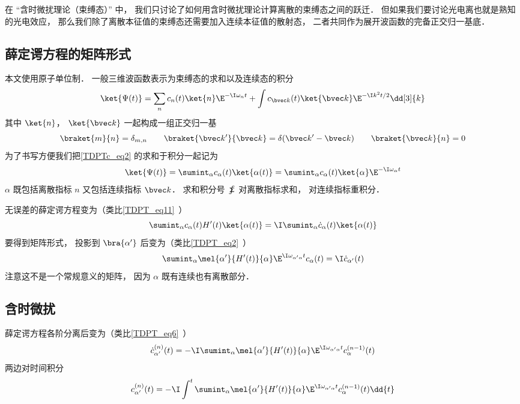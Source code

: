 

在 “含时微扰理论（束缚态）” 中， 我们只讨论了如何用含时微扰理论计算离散的束缚态之间的跃迁． 但如果我们要讨论光电离也就是熟知的光电效应， 那么我们除了离散本征值的束缚态还需要加入连续本征值的散射态， 二者共同作为展开波函数的完备正交归一基底．

\subsection{薛定谔方程的矩阵形式}
本文使用原子单位制． 一般三维波函数表示为束缚态的求和以及连续态的积分
\begin{equation}\label{TDPTc_eq2}
\ket{\Psi(t)} = \sum_n c_n(t)\ket{n}\E^{-\I\omega_n t} + \int c_{\bvec k}(t)\ket{\bvec k}\E^{-\I k^2 t/2} \dd[3]{k}
\end{equation}
其中 $\ket{n}$， $\ket{\bvec k}$ 一起构成一组正交归一基
\begin{equation}
\braket{m}{n} = \delta_{m,n} \qquad
\braket{\bvec k'}{\bvec k} = \delta(\bvec k' - \bvec k) \qquad
\braket{\bvec k}{n} = 0
\end{equation}
为了书写方便我们把\autoref{TDPTc_eq2} 的求和于积分一起记为
\begin{equation}
\ket{\Psi(t)} = \sumint_\alpha c_\alpha(t) \ket{\alpha(t)} = \sumint_\alpha c_\alpha(t) \ket{\alpha}\E^{-\I\omega_\alpha t} 
\end{equation}
$\alpha$ 既包括离散指标 $n$ 又包括连续指标 $\bvec k$． 求和积分号 $\sumint$ 对离散指标求和， 对连续指标重积分．

无误差的薛定谔方程变为（类比\autoref{TDPT_eq11}~）
\begin{equation}
\sumint_\alpha c_\alpha(t) H'(t) \ket{\alpha(t)} = \I \sumint_\alpha \dot c_\alpha(t) \ket{\alpha(t)}
\end{equation}
要得到矩阵形式， 投影到 $\bra{\alpha'}$ 后变为（类比\autoref{TDPT_eq2}~）
\begin{equation}
\sumint_\alpha \mel{\alpha'}{H'(t)}{\alpha} \E^{\I \omega_{\alpha'\alpha} t} c_\alpha(t)
= \I \dot c_{\alpha'} (t)
\end{equation}
注意这不是一个常规意义的矩阵， 因为 $\alpha$ 既有连续也有离散部分．

\subsection{含时微扰}
薛定谔方程各阶分离后变为（类比\autoref{TDPT_eq6}~）
\begin{equation}
\dot c_{\alpha'}^{(n)}(t) = -\I \sumint_\alpha \mel{\alpha'}{H'(t)}{\alpha} \E^{\I \omega_{\alpha'\alpha} t} c_{\alpha}^{(n-1)}(t)
\end{equation}
两边对时间积分
\begin{equation}
c_{\alpha'}^{(n)}(t) = -\I \int^t \sumint_\alpha \mel{\alpha'}{H'(t)}{\alpha} \E^{\I \omega_{\alpha'\alpha} t} c_{\alpha}^{(n-1)}(t) \dd{t}
\end{equation}

